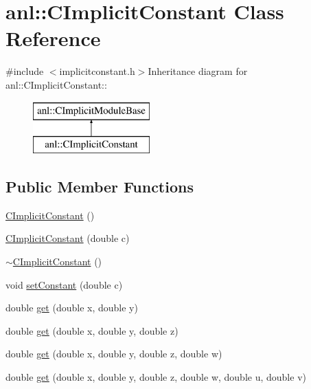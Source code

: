 \hypertarget{classanl_1_1CImplicitConstant}{
\section{anl::CImplicitConstant Class Reference}
\label{classanl_1_1CImplicitConstant}
}


{\ttfamily \#include $<$implicitconstant.h$>$}Inheritance diagram for anl::CImplicitConstant::\begin{figure}[H]
\begin{center}
\leavevmode
\includegraphics[height=2cm]{classanl_1_1CImplicitConstant}
\end{center}
\end{figure}
\subsection*{Public Member Functions}
\begin{DoxyCompactItemize}
\item 
\hyperlink{classanl_1_1CImplicitConstant_a0df33e85702832acc0443e2f307e87aa}{CImplicitConstant} ()
\item 
\hyperlink{classanl_1_1CImplicitConstant_ac9df95572ab892cc52d64f7c44a89a8a}{CImplicitConstant} (double c)
\item 
\hyperlink{classanl_1_1CImplicitConstant_a3dedc6f805613ae4cfb763ac0aaff622}{$\sim$CImplicitConstant} ()
\item 
void \hyperlink{classanl_1_1CImplicitConstant_a12fae8c74864579fb3e1a3ea1dd89d72}{setConstant} (double c)
\item 
double \hyperlink{classanl_1_1CImplicitConstant_afc877ea9b1b8f119f7aeea2dde8b8190}{get} (double x, double y)
\item 
double \hyperlink{classanl_1_1CImplicitConstant_a92a9154b9dee96b7c01637d9b8f879de}{get} (double x, double y, double z)
\item 
double \hyperlink{classanl_1_1CImplicitConstant_a90c57419a55ae0914447f7bf325ca27e}{get} (double x, double y, double z, double w)
\item 
double \hyperlink{classanl_1_1CImplicitConstant_a9f07f5043ff85ae39e0e484887a070d1}{get} (double x, double y, double z, double w, double u, double v)
\end{DoxyCompactItemize}
